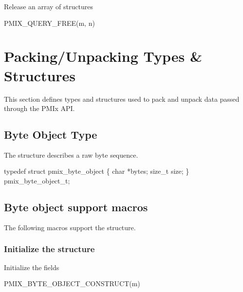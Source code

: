 Release an array of  structures

\cspecificstart
\begin{codepar}
PMIX_QUERY_FREE(m, n)
\end{codepar}
\cspecificend

\begin{arglist}
\end{arglist}

\section{Packing/Unpacking Types \& Structures}

This section defines types and structures used to pack and unpack data passed through the PMIx API.

\subsection{Byte Object Type}

The  structure describes a raw byte sequence.

\cspecificstart
\begin{codepar}
typedef struct pmix_byte_object \{
    char *bytes;
    size_t size;
\} pmix_byte_object_t;
\end{codepar}
\cspecificend

\subsection{Byte object support macros}
The following macros support the  structure.

\subsubsection{Initialize the  structure}

Initialize the  fields

\cspecificstart
\begin{codepar}
PMIX_BYTE_OBJECT_CONSTRUCT(m)
\end{codepar}
\cspecificend

